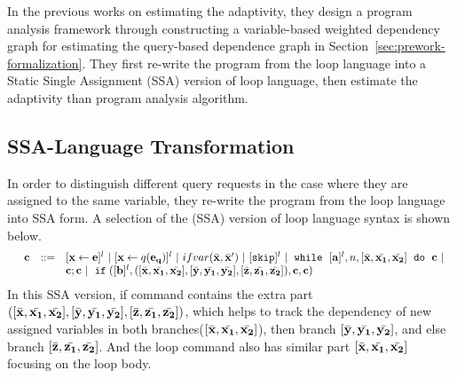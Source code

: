 In the previous works on estimating the adaptivity, they design a program analysis framework
through constructing a variable-based weighted dependency graph for
estimating the query-based dependence graph in Section~\ref{sec:prework-formalization}.
They first re-write the program from the loop language into
a Static Single Assignment (SSA) version of loop language, then estimate the adaptivity than program analysis algorithm.
\subsection{SSA-Language Transformation}
In order to distinguish different query requests in the case where they are assigned to
the same variable, they re-write the program from the loop language into SSA form.
A selection of the (SSA) version of loop language syntax is shown below.
\[
\begin{array}{llll}
 & \ssa{c} & ::= &   [\assign {\ssa{x}}{ \ssa{\expr}}]^{l} ~|~  [\assign {{\ssa{x}} } {q({\ssa{e_q}})}]^{l}
%
~|~  {{ifvar(\bar{\ssa{x}}, \bar{\ssa{x}}')}}  ~|~ [\eskip]^{l}  ~|~
 \eloop ~ [{\ssa{\aexpr}}]^{l}, {n},  [\bar{\ssa{x}}, \bar{\ssa{x_1}}, \bar{\ssa{x_2}}] ~ \edo ~ {\ssa{c}}  ~|~ \\ &&& \ssa{c};\ssa{c}  ~|~  \eif([\ssa{\bexpr}]^{l}, ([\bar{\ssa{x}}, \bar{\ssa{x_1}}, \bar{\ssa{x_2}}] , [\bar{\ssa{y}}, \bar{\ssa{y_1}}, \bar{\ssa{y_2}}],[\bar{\ssa{z}}, \bar{\ssa{z_1}}, \bar{\ssa{z_2}}] ) , \ssa{c}, \ssa{c}) 	
\end{array}
\]
In this SSA version, if command contains the extra part $([\bar{{\bf{{x}}}}, \bar{{\bf{{x_1}}}}, \bar{{\bf{{x_2}}}}] ,
[\bar{{\bf{{y}}}}, \bar{{\bf{{y_1}}}}, \bar{{\bf{{y_2}}}}],[\bar{{\bf{{z}}}}, \bar{{\bf{{z_1}}}}, \bar{{\bf{{z_2}}}}] )$,
which helps to track the dependency of new assigned variables in both branches($[\bar{{\bf{{x}}}}, \bar{{\bf{{x_1}}}}, \bar{{\bf{{x_2}}}}]$),
then branch $[\bar{{\bf{{y}}}}, \bar{{\bf{{y_1}}}}, \bar{{\bf{{y_2}}}}]$, and else branch $[\bar{{\bf{{z}}}}, \bar{{\bf{{z_1}}}}, \bar{{\bf{{z_2}}}}] $. 
And the loop command also has similar part $ [\bar{{\bf{{x}}}}, \bar{{\bf{{x_1}}}}, \bar{{\bf{{x_2}}}}]$ focusing on the loop body.

